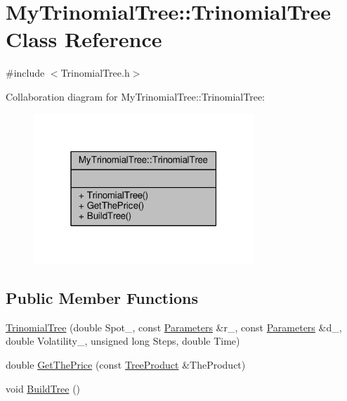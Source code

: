 \hypertarget{classMyTrinomialTree_1_1TrinomialTree}{}\section{My\+Trinomial\+Tree\+:\+:Trinomial\+Tree Class Reference}
\label{classMyTrinomialTree_1_1TrinomialTree}


{\ttfamily \#include $<$Trinomial\+Tree.\+h$>$}



Collaboration diagram for My\+Trinomial\+Tree\+:\+:Trinomial\+Tree\+:
\nopagebreak
\begin{figure}[H]
\begin{center}
\leavevmode
\includegraphics[width=235pt]{classMyTrinomialTree_1_1TrinomialTree__coll__graph}
\end{center}
\end{figure}
\subsection*{Public Member Functions}
\begin{DoxyCompactItemize}
\item 
\hyperlink{classMyTrinomialTree_1_1TrinomialTree_ae83aba0816cc8988e8c1842cc41590b2}{Trinomial\+Tree} (double Spot\+\_\+, const \hyperlink{classParameters}{Parameters} \&r\+\_\+, const \hyperlink{classParameters}{Parameters} \&d\+\_\+, double Volatility\+\_\+, unsigned long Steps, double Time)
\item 
double \hyperlink{classMyTrinomialTree_1_1TrinomialTree_a2627d85fdca2354085193486755b81e2}{Get\+The\+Price} (const \hyperlink{classTreeProduct}{Tree\+Product} \&The\+Product)
\item 
void \hyperlink{classMyTrinomialTree_1_1TrinomialTree_a47dd32274bada6fbd59fe0e048d92b58}{Build\+Tree} ()
\end{DoxyCompactItemize}


